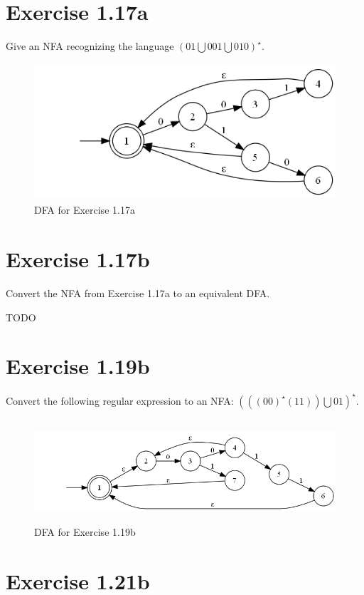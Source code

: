 \documentclass{article}
\newcommand{\union}{\bigcup}
\begin{document}
\section{Exercise 1.17a}

Give an NFA recognizing the language $(01 \union 001 \union 010)^\star$.

\begin{figure}[h!]
	\centering
	\includegraphics[height=2.0in]{1_17_a.png}
	\caption{DFA for Exercise 1.17a}
\end{figure}

\section{Exercise 1.17b}

Convert the NFA from Exercise 1.17a to an equivalent DFA.

TODO

\section{Exercise 1.19b}

Convert the following regular expression to an NFA: $(((00)^\star (11)) \union
01)^\star$.

\begin{figure}[h!]
	\centering
	\includegraphics[height=1.5in]{1_19.png}
	\caption{DFA for Exercise 1.19b}
\end{figure}

\section{Exercise 1.21b}
\end{document}
